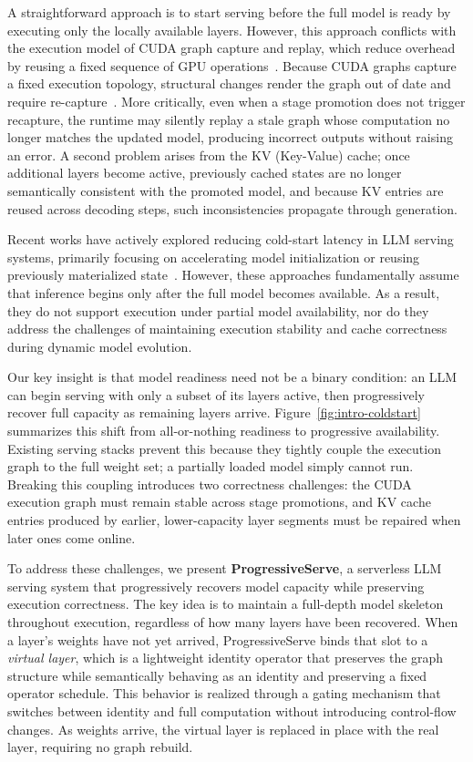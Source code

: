 \documentclass[sigplan,anonymous,review,nonacm]{acmart}
\begin{document}
A straightforward approach is to start serving before the full model is ready by executing only the locally available layers. However, this approach conflicts with the execution model of CUDA graph capture and replay, which reduce overhead by reusing a fixed sequence of GPU operations~\cite{nvidia_cuda_graphs}. Because CUDA graphs capture a fixed execution topology, structural changes render the graph out of date and require re-capture~\cite{nvidia_cuda_graphs}. More critically, even when a stage promotion does not trigger recapture, the runtime may silently replay a stale graph whose computation no longer matches the updated model, producing incorrect outputs without raising an error. A second problem arises from the KV (Key-Value) cache; once additional layers become active, previously cached states are no longer semantically consistent with the promoted model, and because KV entries are reused across decoding steps, such inconsistencies propagate through generation.

Recent works have actively explored reducing cold-start latency in LLM serving systems, primarily focusing on accelerating model initialization or reusing previously materialized state~\cite{serverlessllm, deepserve, hydraserve, lscale}. However, these approaches fundamentally assume that inference begins only after the full model becomes available. As a result, they do not support execution under partial model availability, nor do they address the challenges of maintaining execution stability and cache correctness during dynamic model evolution.

Our key insight is that model readiness need not be a binary condition: an LLM can begin serving with only a subset of its layers active, then progressively recover full capacity as remaining layers arrive. Figure~\ref{fig:intro-coldstart} summarizes this shift from all-or-nothing readiness to progressive availability. Existing serving stacks prevent this because they tightly couple the execution graph to the full weight set; a partially loaded model simply cannot run. Breaking this coupling introduces two correctness challenges: the CUDA execution graph must remain stable across stage promotions, and KV cache entries produced by earlier, lower-capacity layer segments must be repaired when later ones come online.

To address these challenges, we present \textbf{ProgressiveServe}, a serverless LLM serving system that progressively recovers model capacity while preserving execution correctness. The key idea is to maintain a full-depth model skeleton throughout execution, regardless of how many layers have been recovered. When a layer's weights have not yet arrived, ProgressiveServe binds that slot to a \textit{virtual layer}, which is a lightweight identity operator that preserves the graph structure while semantically behaving as an identity and preserving a fixed operator schedule. This behavior is realized through a gating mechanism that switches between identity and full computation without introducing control-flow changes. As weights arrive, the virtual layer is replaced in place with the real layer, requiring no graph rebuild. 
\end{document}
